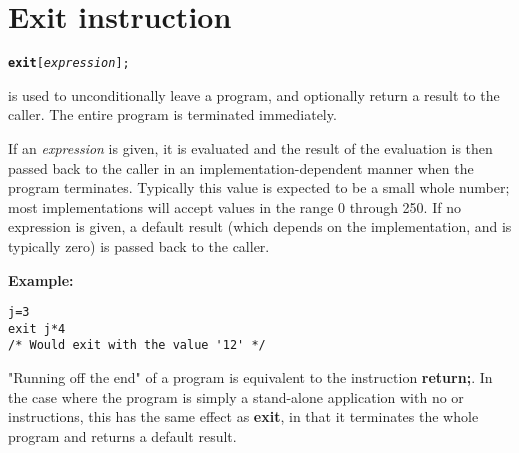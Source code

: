 \section{Exit instruction}\label{refexit}
\begin{shaded}
\begin{alltt}
\textbf{exit} [\emph{expression}];
\end{alltt}
\end{shaded}
  is used to unconditionally leave a program, and
optionally return a result to the caller.
The entire program is terminated immediately.

If an \emph{expression} is given, it is evaluated and the result
of the evaluation is then passed back to the caller in an
implementation-dependent manner when the program terminates.
Typically this value is expected to be a small whole number; most
implementations will accept values in the range 0 through 250.
If no expression is given, a default result (which depends on the
implementation, and is typically zero) is passed back to the caller.

\textbf{Example:}
\begin{lstlisting}
j=3
exit j*4
/* Would exit with the value '12' */
\end{lstlisting}
 "Running off the end" of a program is equivalent to the
instruction \textbf{return;}.  In the case where the program is simply
a stand-alone application with no  or 
instructions, this has the same effect as \textbf{exit}, in that it
terminates the whole program and returns a default result.
